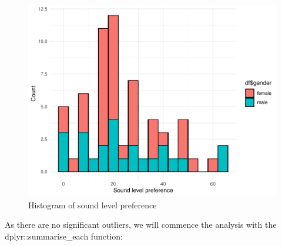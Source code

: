 \documentclass[]{article}
\newenvironment{Shaded}{\begin{snugshade}}{\end{snugshade}}
\newcommand{\DataTypeTok}[1]{\textcolor[rgb]{0.13,0.29,0.53}{#1}}
\newcommand{\DecValTok}[1]{\textcolor[rgb]{0.00,0.00,0.81}{#1}}
\newcommand{\KeywordTok}[1]{\textcolor[rgb]{0.13,0.29,0.53}{\textbf{#1}}}
\newcommand{\NormalTok}[1]{#1}
\newcommand{\OperatorTok}[1]{\textcolor[rgb]{0.81,0.36,0.00}{\textbf{#1}}}
\newcommand{\StringTok}[1]{\textcolor[rgb]{0.31,0.60,0.02}{#1}}
\begin{document}
\begin{Shaded}
\end{Shaded}

\begin{figure}
\centering
\includegraphics{Personality-Data-Analysis-Portfolio-1_files/figure-latex/unnamed-chunk-4-1.pdf}
\caption{\label{fig:unnamed-chunk-4}Histogram of sound level preference}
\end{figure}

As there are no significant outliers, we will commence the analysis with the dplyr::summarise\_each function:

\begin{Shaded}
\end{Shaded}
\end{document}
